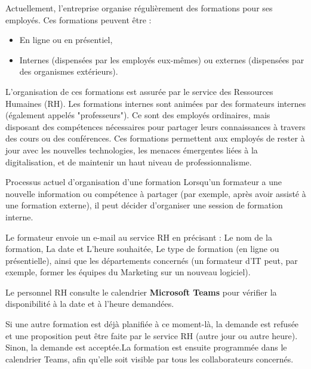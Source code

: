 \documentclass{article}
\begin{document}
\vspace{0,3cm}
\noindent Actuellement, l’entreprise organise régulièrement des formations pour ses employés. Ces formations peuvent être :
\begin{itemize}
    \item En ligne ou en présentiel,
    \item Internes (dispensées par les employés eux-mêmes) ou externes (dispensées par des organismes extérieurs).
\end{itemize}
\vspace{0,3cm}
L’organisation de ces formations est assurée par le service des Ressources Humaines (RH).
Les formations internes sont animées par des formateurs internes (également appelés "professeurs"). Ce sont des employés ordinaires, mais disposant des compétences nécessaires pour partager leurs connaissances à travers des cours ou des conférences. Ces formations permettent aux employés de rester à jour avec les nouvelles technologies, les menaces émergentes liées à la digitalisation, et de maintenir un haut niveau de professionnalisme.

\vspace{0,3cm}

\noindent Processus actuel d’organisation d’une formation
Lorsqu’un formateur a une nouvelle information ou compétence à partager (par exemple, après avoir assisté à une formation externe), il peut décider d’organiser une session de formation interne.

\vspace{0,3cm}

\noindent Le formateur envoie un e-mail au service RH en précisant : Le nom de la formation, La date et L’heure souhaitée, Le type de formation (en ligne ou présentielle), ainsi que les départements concernés (un formateur d’IT peut, par exemple, former les équipes du Marketing sur un nouveau logiciel).

\vspace{0,3cm}
\noindent Le personnel RH consulte le calendrier \textbf{Microsoft Teams} pour vérifier la disponibilité à la date et à l’heure demandées.

\vspace{0,3cm}

\noindent Si une autre formation est déjà planifiée à ce moment-là, la demande est refusée et une proposition peut être faite par le service RH  (autre jour ou autre heure). Sinon, la demande est acceptée.La formation est ensuite programmée dans le calendrier Teams, afin qu’elle soit visible par tous les collaborateurs concernés.
\end{document}
